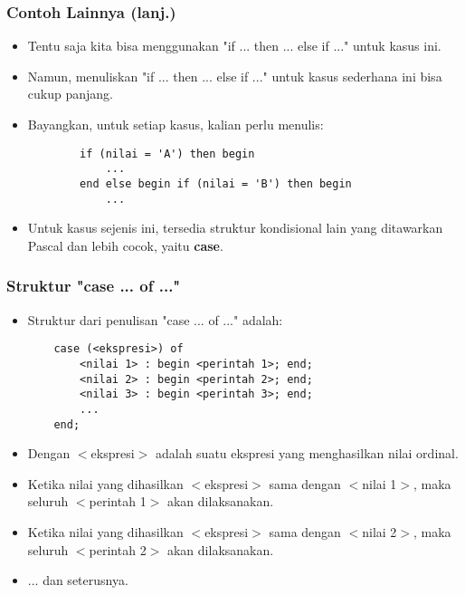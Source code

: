\documentclass{beamer}
\begin{document}
\begin{frame}[fragile]
\frametitle{Contoh Lainnya (lanj.)}
\begin{itemize}
    \item Tentu saja kita bisa menggunakan "if ... then ... else if ..." untuk kasus ini.
    \item Namun, menuliskan "if ... then ... else if ..." untuk kasus sederhana ini bisa cukup panjang.
    \item Bayangkan, untuk setiap kasus, kalian perlu menulis:
    \begin{lstlisting}
        if (nilai = 'A') then begin
            ...
        end else begin if (nilai = 'B') then begin
            ...
    \end{lstlisting}
    \item Untuk kasus sejenis ini, tersedia struktur kondisional lain yang ditawarkan Pascal dan lebih cocok, yaitu \alert{\textbf{case}}.
\end{itemize}
\end{frame}

\begin{frame}[fragile]
\frametitle{Struktur "case ... of ..."}
\begin{itemize}
    \item Struktur dari penulisan "case ... of ..." adalah:
    \begin{lstlisting}
    case (<ekspresi>) of
        <nilai 1> : begin <perintah 1>; end;
        <nilai 2> : begin <perintah 2>; end;
        <nilai 3> : begin <perintah 3>; end;
        ...
    end;
    \end{lstlisting}

    \item Dengan $<$ekspresi$>$ adalah suatu ekspresi yang menghasilkan \alert{nilai ordinal}.
    \item Ketika nilai yang dihasilkan $<$ekspresi$>$ sama dengan $<$nilai 1$>$, maka seluruh $<$perintah 1$>$ akan dilaksanakan.
    \item Ketika nilai yang dihasilkan $<$ekspresi$>$ sama dengan $<$nilai 2$>$, maka seluruh $<$perintah 2$>$ akan dilaksanakan.
    \item ... dan seterusnya.
\end{itemize}
\end{frame}
\end{document}
